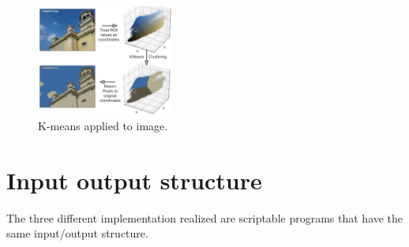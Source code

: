 \documentclass[10pt,twocolumn,letterpaper]{article}
\begin{document}
\begin{figure}[H]
\includegraphics[width=0.4\textwidth]{latex/clustering.png}
\caption{K-means applied to image.}
\label{etichetta}
\end{figure}


\section{Input output structure}

The three different implementation realized are scriptable programs that have the same input/output structure.
\end{document}
